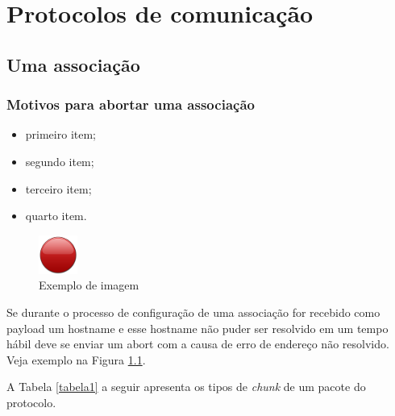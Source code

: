 \chapter{Protocolos de comunicação} \label{capitulo2}

\section{Uma associação}

\lipsum[1-3] 

\subsection{Motivos para abortar uma associação}

\begin{itemize}
	\item primeiro item;
	\item segundo item;
	\item terceiro item;
	\item quarto item.
\end{itemize}

\begin{figure}[h]
	\centering
	\includegraphics[scale=0.8]{imagens/red.png}
	\caption{Exemplo de imagem}
	\label{imagem1}
\end{figure}

Se durante o processo de configuração de uma associação for recebido como payload um hostname e esse hostname não puder ser resolvido em um tempo hábil deve se enviar um abort com a causa de erro de endereço não resolvido. Veja exemplo na Figura \ref{imagem1}.

\lipsum[1-4] 

A Tabela \ref{tabela1} a seguir apresenta os tipos de \textit{chunk} de um pacote do protocolo.

